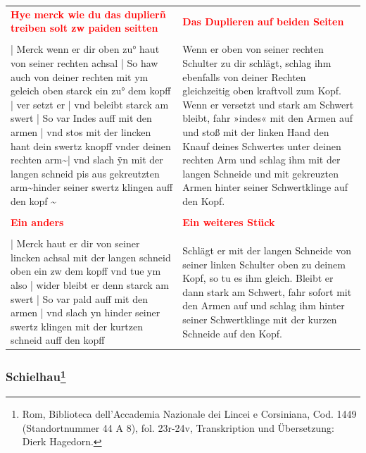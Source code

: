 \begin{longtable}{p{6.25cm}p{6.25cm}}
\textbf{\textcolor{red}{Hye merck wie du das duplierñ treiben solt zw paiden seitten}}
&
\textbf{\textcolor{red}{Das Duplieren auf beiden Seiten}}
\\
\\
| Merck wenn er dir oben zu° haut von seiner rechten achsal | So haw auch von deiner rechten mit ym geleich oben starck ein zu° dem kopff | ver setzt er | vnd beleibt starck am swert | So var Indes auff mit den armen | vnd stos mit der lincken hant dein swertz knopff vnder deinen rechten arm\textasciitilde  | vnd slach ÿn mit der langen schneid pis aus gekreutzten arm\textasciitilde  hinder seiner swertz klingen auff den kopf \textasciitilde 
&
Wenn er oben von seiner rechten Schulter zu dir schlägt, schlag ihm ebenfalls von deiner Rechten gleichzeitig oben kraftvoll zum Kopf. Wenn er versetzt und stark am Schwert bleibt, fahr »indes« mit den Armen auf und stoß mit der linken Hand den Knauf deines Schwertes unter deinen rechten Arm und schlag ihm mit der langen Schneide und mit gekreuzten Armen hinter seiner Schwertklinge auf den Kopf.
\\
\\
\textbf{\textcolor{red}{Ein anders}}
&
\textbf{\textcolor{red}{Ein weiteres Stück}}
\\
\\
| Merck haut er dir von seiner lincken achsal mit der langen schneid oben ein zw dem kopff vnd tue ym also | wider bleibt er denn starck am swert | So var pald auff mit den armen | vnd slach yn hinder seiner swertz klingen mit der kurtzen schneid auff den kopff
&
Schlägt er mit der langen Schneide von seiner linken Schulter oben zu deinem Kopf, so tu es ihm gleich. Bleibt er dann stark am Schwert, fahr sofort mit den Armen auf und schlag ihm hinter seiner Schwertklinge mit der kurzen Schneide auf den Kopf.
\end{longtable}

\newpage

\begin{center}
\end{center}

\newpage

\subsubsection[Schielhau]{Schielhau\footnote{\hspace*{0.5ex}Rom, Biblioteca dell'Accademia Nazionale dei Lincei e Corsiniana, Cod. 1449 (Standortnummer 44 A 8), fol. 23r-24v, Transkription und Übersetzung: Dierk Hagedorn.}}

